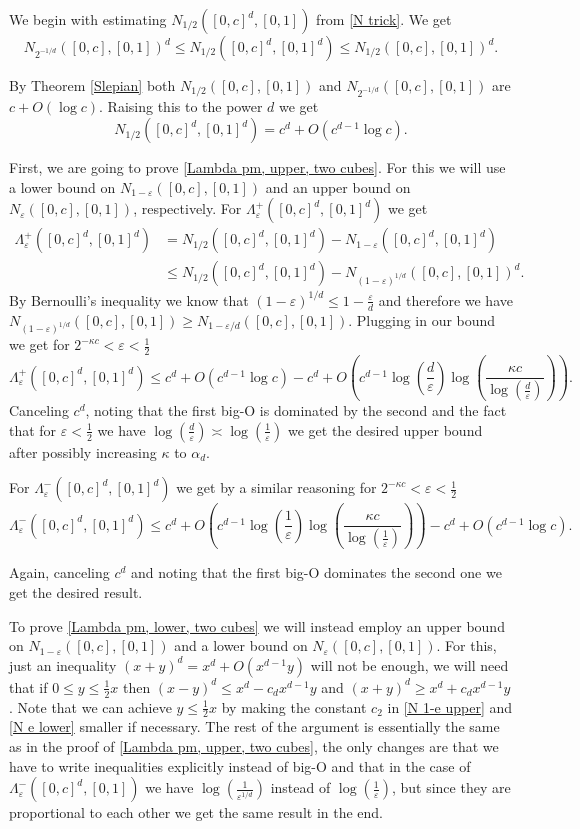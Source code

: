 \documentclass[12pt]{amsart}
\numberwithin{equation}{section}
\newcommand{\eps}{\varepsilon}
\begin{document}
We begin with estimating $N_{1/2}([0,c]^d,[0,1])$ from \eqref{N trick}. We get
$$N_{2^{-1/d}}([0, c], [0,1])^d\le N_{1/2}([0,c]^d,[0,1]^d)\le N_{1/2}([0,c],[0,1])^d.$$

By Theorem \ref{Slepian} both $N_{1/2}([0,c],[0,1])$ and $N_{2^{-1/d}}([0,c],[0,1])$ are  $c + O(\log c)$. Raising this to the power $d$ we get
\begin{equation}\label{N 1/2}
N_{1/2}([0,c]^d,[0,1]^d) = c^d +O(c^{d-1}\log c).
\end{equation}

First, we are going to prove \eqref{Lambda pm, upper, two cubes}. For this we will use a lower bound on $N_{1-\eps}([0,c],[0,1])$ and an upper bound on $N_\eps([0,c],[0,1])$, respectively. For $\Lambda_\eps^+([0,c]^d,[0,1]^d)$ we get 
\begin{align*}
\Lambda_\eps^+([0,c]^d,[0,1]^d) &= N_{1/2}([0,c]^d,[0,1]^d) - N_{1-\eps}([0,c]^d,[0,1]^d)\\
&\le N_{1/2}([0,c]^d,[0,1]^d) - N_{(1-\eps)^{1/d}}([0,c],[0,1])^d.
\end{align*}
By Bernoulli's inequality we know that $(1-\eps)^{1/d} \le 1-\frac{\eps}{d}$ and therefore we have $N_{(1-\eps)^{1/d}}([0,c],[0,1]) \geq N_{1-\eps/d}([0,c],[0,1])$. Plugging in our bound we get for $2^{-\kappa c} < \eps < \frac{1}{2}$
$$\Lambda_\eps^+([0,c]^d,[0,1]^d) \le c^d + O(c^{d-1}\log c) - c^d + O\left(c^{d-1}\log\left(\frac{d}{\eps}\right) \log\left(\frac{\kappa c}{\log(\frac{d}{\eps})}\right)\right).$$
Canceling $c^d$, noting that the first big-O is dominated by the second and the fact that for $\eps < \frac{1}{2}$ we have $\log\left(\frac{d}{\eps}\right)\asymp \log\left(\frac{1}{\eps}\right)$ we get the desired upper bound after possibly increasing $\kappa$ to $\alpha_d$.

For $\Lambda_\eps^-([0,c]^d,[0,1]^d)$ we get by a similar reasoning for $2^{-\kappa c} < \eps < \frac{1}{2}$
$$\Lambda_\eps^-([0,c]^d,[0,1]^d) \le c^d + O\left(c^{d-1}\log\left(\frac{1}{\eps}\right)\log\left(\frac{\kappa c}{\log\left(\frac{1}{\eps}\right)}\right)\right)-c^d + O(c^{d-1}\log c).$$

Again, canceling $c^d$ and noting that the first big-O dominates the second one we get the desired result.

To prove \eqref{Lambda pm, lower, two cubes} we will instead employ an upper bound on $N_{1-\eps}([0,c],[0,1])$ and a lower bound on $N_\eps([0,c],[0,1])$. For this, just an inequality $(x+y)^d = x^d + O(x^{d-1}y)$ will not be enough, we will need that if $0\le y \le \frac{1}{2}x$ then $(x-y)^d \le x^d - c_d x^{d-1}y$ and $(x+y)^d \ge x^d + c_d x^{d-1}y$. Note that we can achieve $y \le \frac{1}{2}x$ by making {the constant $c_2$ in \eqref{N 1-e upper} and \eqref{N e lower}} smaller if necessary. The rest of the argument is essentially the same as in the proof of \eqref{Lambda pm, upper, two cubes}, the only changes are that we have to write inequalities explicitly instead of big-O and that in the case of $\Lambda^-_\eps([0,c]^d,[0,1])$ we have $\log\left(\frac{1}{\eps^{1/d}}\right)$ instead of $\log\left(\frac{1}{\eps}\right)$, but since they are proportional to each other we get the same result in the end.
\end{document}
